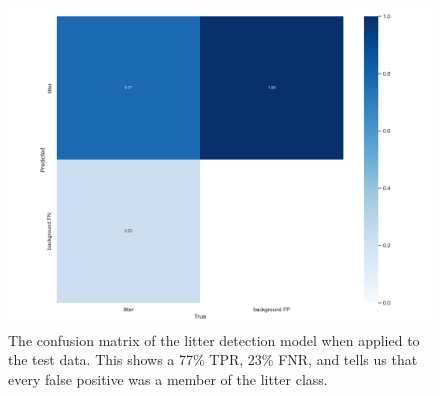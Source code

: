 \documentclass{thesis}
\begin{document}
\begin{appendices}
\begin{figure}[h!]
    \centering
    \includegraphics[scale=0.5]{images/fm-confusion-matrix.png}
    \caption{The confusion matrix of the litter detection model when applied to the test data. This shows a 77\% TPR, 23\% FNR, and tells us that every false positive was a member of the litter class.}
    \label{fig:fm-confusion-matrix}
\end{figure}

\end{appendices}



\renewcommand{\thechapter}{0} %

\end{document}
